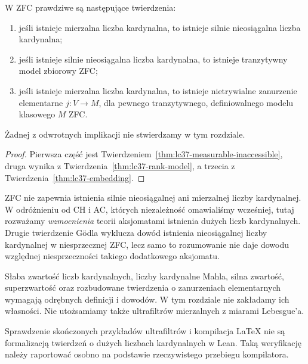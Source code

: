 \begin{twierdzenie}
\label{thm:lc37-hierarchy}
W ZFC prawdziwe są następujące twierdzenia:
\begin{enumerate}
\item jeśli istnieje mierzalna liczba kardynalna,
to istnieje silnie nieosiągalna liczba kardynalna;
\item jeśli istnieje silnie nieosiągalna
liczba kardynalna, to istnieje tranzytywny
model zbiorowy ZFC;
\item jeśli istnieje mierzalna liczba kardynalna,
to istnieje nietrywialne zanurzenie
elementarne $j:V\to M$, dla pewnego
tranzytywnego, definiowalnego
modelu klasowego $M$ ZFC.
\end{enumerate}
Żadnej z odwrotnych implikacji nie
stwierdzamy w tym rozdziale.
\end{twierdzenie}
\begin{proof}
Pierwsza część jest
Twierdzeniem~\ref{thm:lc37-measurable-inaccessible},
druga wynika z
Twierdzenia~\ref{thm:lc37-rank-model},
a trzecia z
Twierdzenia~\ref{thm:lc37-embedding}.
\end{proof}

\begin{uwaga}
\label{rem:lc37-new-axioms}
ZFC nie zapewnia istnienia
silnie nieosiągalnej ani mierzalnej
liczby kardynalnej. W odróżnieniu od CH i AC,
których niezależność omawialiśmy
wcześniej, tutaj rozważamy
\emph{wzmocnienia} teorii aksjomatami
istnienia dużych liczb kardynalnych.
Drugie twierdzenie Gödla wyklucza
dowód istnienia nieosiągalnej liczby kardynalnej w
niesprzecznej ZFC, lecz samo
to rozumowanie nie daje dowodu
względnej niesprzeczności
takiego dodatkowego aksjomatu.
\end{uwaga}

\begin{uwaga}
\label{rem:lc37-next}
Słaba zwartość liczb kardynalnych,
liczby kardynalne Mahla,
silna zwartość, superzwartość
oraz rozbudowane twierdzenia o
zanurzeniach elementarnych
wymagają odrębnych definicji
i dowodów. W tym rozdziale
nie zakładamy ich własności.
Nie utożsamiamy także
ultrafiltrów mierzalnych z
miarami Lebesgue'a.
\end{uwaga}

\begin{uwaga}
\label{rem:lc37-formal}
Sprawdzenie skończonych przykładów
ultrafiltrów i kompilacja LaTeX
nie są formalizacją twierdzeń
o dużych liczbach kardynalnych w Lean.
Taką weryfikację należy
raportować osobno na podstawie
rzeczywistego przebiegu kompilatora.
\end{uwaga}
